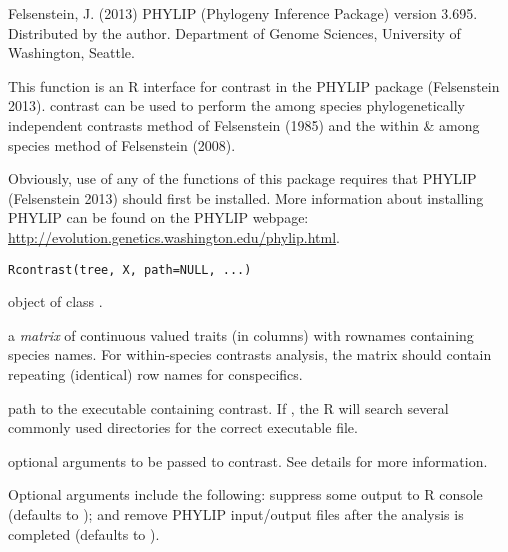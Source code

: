 \documentclass[a4paper]{book}
\begin{document}
%
\begin{References}\relax
Felsenstein, J. (2013) PHYLIP (Phylogeny Inference Package) version 3.695. Distributed by the author. Department of Genome Sciences, University of Washington, Seattle.
\end{References}
%
\begin{SeeAlso}\relax
{}
\end{SeeAlso}
%
\begin{Description}\relax
This function is an R interface for contrast in the PHYLIP package (Felsenstein 2013). contrast can be used to perform the among species phylogenetically independent contrasts method of Felsenstein (1985) and the within \& among species method of Felsenstein (2008).

Obviously, use of any of the functions of this package requires that PHYLIP (Felsenstein 2013) should first be installed. More information about installing PHYLIP can be found on the PHYLIP webpage: \url{http://evolution.genetics.washington.edu/phylip.html}.
\end{Description}
%
\begin{Usage}
\begin{verbatim}
Rcontrast(tree, X, path=NULL, ...)
\end{verbatim}
\end{Usage}
%
\begin{Arguments}
\begin{ldescription}
\item[\code{tree}] object of class .
\item[\code{X}] a \emph{matrix} of continuous valued traits (in columns) with rownames containing species names. For within-species contrasts analysis, the matrix should contain repeating (identical) row names for conspecifics.
\item[\code{path}] path to the executable containing contrast. If , the R will search several commonly used directories for the correct executable file.
\item[\code{...}] optional arguments to be passed to contrast. See details for more information.
\end{ldescription}
\end{Arguments}
%
\begin{Details}\relax
Optional arguments include the following:  suppress some output to R console (defaults to ); and  remove PHYLIP input/output files after the analysis is completed (defaults to ).
\end{Details}
\end{document}
